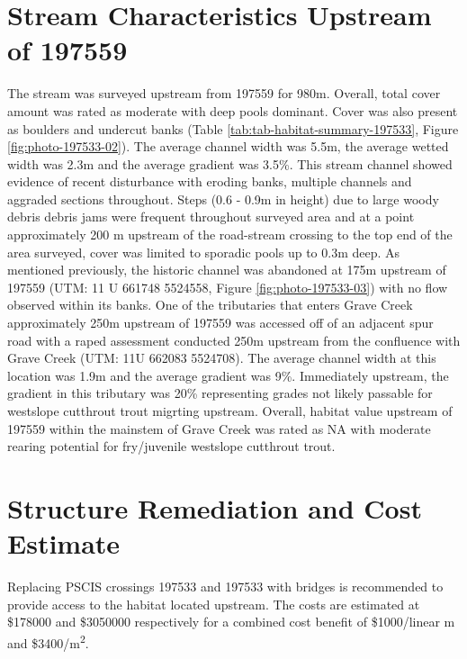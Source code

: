 \documentclass[
]{book}
\begin{document}
\hypertarget{stream-characteristics-upstream-of-197559}{%
\section*{Stream Characteristics Upstream of 197559}\label{stream-characteristics-upstream-of-197559}}

The stream was surveyed upstream from 197559 for 980m. Overall, total cover amount was rated as moderate with deep pools dominant. Cover was also present as boulders and undercut banks (Table \ref{tab:tab-habitat-summary-197533}, Figure \ref{fig:photo-197533-02}). The average channel width was 5.5m, the average wetted width was 2.3m and the average gradient was 3.5\%. This stream channel showed evidence of recent disturbance with eroding banks, multiple channels and aggraded sections throughout. Steps (0.6 - 0.9m in height) due to large woody debris debris jams were frequent throughout surveyed area and at a point approximately 200 m upstream of the road-stream crossing to the top end of the area surveyed, cover was limited to sporadic pools up to 0.3m deep. As mentioned previously, the historic channel was abandoned at 175m upstream of 197559 (UTM: 11 U 661748 5524558, Figure \ref{fig:photo-197533-03}) with no flow observed within its banks. One of the tributaries that enters Grave Creek approximately 250m upstream of 197559 was accessed off of an adjacent spur road with a raped assessment conducted 250m upstream from the confluence with Grave Creek (UTM: 11U 662083 5524708). The average channel width at this location was 1.9m and the average gradient was 9\%. Immediately upstream, the gradient in this tributary was 20\% representing grades not likely passable for westslope cutthrout trout migrting upstream. Overall, habitat value upstream of 197559 within the mainstem of Grave Creek was rated as NA with moderate rearing potential for fry/juvenile westslope cutthrout trout.

\hypertarget{structure-remediation-and-cost-estimate-6}{%
\section*{Structure Remediation and Cost Estimate}\label{structure-remediation-and-cost-estimate-6}}

Replacing PSCIS crossings 197533 and 197533 with bridges is recommended to provide access to the habitat located upstream. The costs are estimated at \$178000 and \$3050000 respectively for a combined cost benefit of \$1000/linear m and \$3400/m\textsuperscript{2}.
\end{document}
